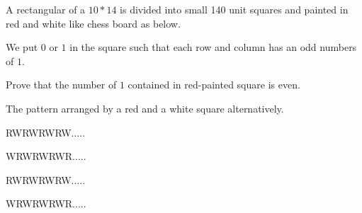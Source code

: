 A rectangular of a $ 10*14$ is divided into small 140 unit squares and painted in red and white like chess board as below.

We put $ 0$ or $ 1$ in the square such that each row and column has an odd numbers of $ 1$.

Prove that the number of $ 1$ contained in red-painted square is even.

The pattern arranged by a red and a white square alternatively.

RWRWRWRW.....

WRWRWRWR.....

RWRWRWRW.....

WRWRWRWR.....